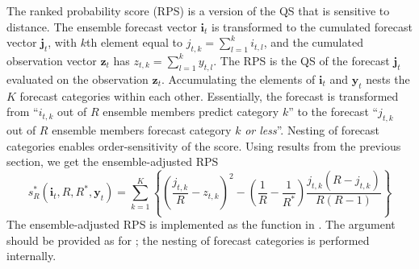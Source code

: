 \documentclass[article]{jss}\usepackage[]{graphicx}\usepackage[]{color}
\begin{document}
The ranked probability score (RPS) is a version of the QS that is sensitive to distance.
The ensemble forecast vector $\mathbf{i}_t$ is transformed to the cumulated forecast vector $\mathbf{j}_t$, with $k$th element equal to $j_{t,k} = \sum_{l=1}^k i_{t,l}$, and the cumulated observation vector $\mathbf{z}_t$ has $z_{t,k} = \sum_{l=1}^k y_{t,l}$.
The RPS is the QS of the forecast $\mathbf{j}_t$ evaluated on the observation $\mathbf{z}_t$.
Accumulating the elements of $\mathbf{i}_t$ and $\mathbf{y}_t$ nests the $K$ forecast categories within each other. 
Essentially, the forecast is transformed from ``$i_{t,k}$ out of $R$ ensemble members predict category $k$'' to the forecast ``$j_{t,k}$ out of $R$ ensemble members forecast category $k$ \emph{or less}''.
Nesting of forecast categories enables order-sensitivity of the score.
Using results from the previous section, we get the ensemble-adjusted RPS
%
\begin{equation}
s_{R}^*(\mathbf{i}_t, R, R^*, \mathbf{y}_t) = \sum_{k=1}^K \left\{ \left(\frac{j_{t,k}}{R} - z_{t,k}\right)^2 - \left(\frac{1}{R} - \frac{1}{R^*}\right) \frac{j_{t,k}(R-j_{t,k})}{R(R-1)}\right\}
\end{equation}
%
The ensemble-adjusted RPS is implemented as the function  in .
The argument  should be provided as for ; the nesting of forecast categories is performed internally.
\end{document}
